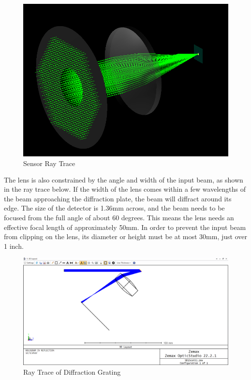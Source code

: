 \documentclass[journal]{IEEEtran}
\begin{document}
\begin{figure}[H]
    \caption{Sensor Ray Trace}
    \centering
    \includegraphics[width=0.5\linewidth]{images/ColimatedBeam.png}
\end{figure}

The lens is also constrained by the angle and width of the input beam, as shown in the ray trace below. If the width of the lens comes within a few wavelengths of the beam approaching the diffraction plate, the beam will diffract around its edge. The size of the detector is 1.36mm across, and the beam needs to be focused from the full angle of about 60 degrees. This means the lens needs an effective focal length of approximately 50mm. In order to prevent the input beam from clipping on the lens, its diameter or height must be at most 30mm, just over 1 inch. 

\begin{figure}[H]
    \caption{Ray Trace of Diffraction Grating}
    \centering
    \includegraphics[width=0.75\linewidth]{images/Zemax Ray Trace.png}
\end{figure}
\end{document}

